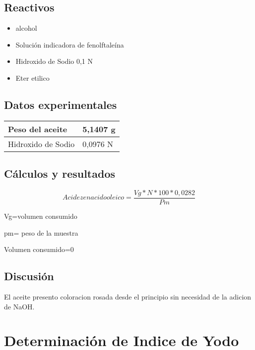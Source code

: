 \documentclass[a4paper,12pt]{article} %
\begin{document}
\subsection{Reactivos} 
\begin{itemize}
    \item{alcohol} 
    \item{Solución indicadora de fenolftaleína}
    \item{Hidroxido de Sodio 0,1 N}
    \item{Eter etilico}
\end{itemize}

\subsection{Datos experimentales}

\begin{table}[H]
\begin{tabular}{@{}|l|l|@{}}
\toprule
Peso del aceite    & 5,1407 g \\ \midrule
Hidroxido de Sodio & 0,0976 N \\ \bottomrule
\end{tabular}
\end{table}

\subsection{Cálculos y resultados} 
\[Acidez en acido oleico=\frac{Vg*N*100*0,0282}{Pm}\]
\item{Vg=volumen consumido}
\item{pm= peso de la muestra}
\item{Volumen consumido=0}

\subsection{Discusión} 
El aceite presento coloracion rosada desde el principio sin necesidad de la adicion de NaOH.

\section{Determinación de Indice de Yodo}
\end{document}
